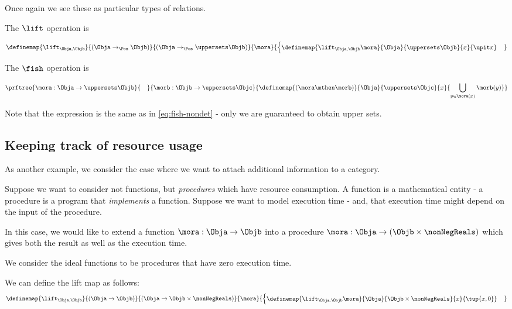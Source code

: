 Once again we see these as particular types of relations.

The $\lift$ operation is

\begin{equation}
    \definemap%
    {\lift_{\Obja, \Objb}}%
    {(\Obja \to_{\Pos} \Objb)}%
    {(\Obja \to_{\Pos} \uppersets\Objb)}%
    {\mora}{%
    \begin{cases}
    \definemap{\lift_{\Obja, \Objb}\mora}%
    {\Obja}{\uppersets\Objb}
    {x}{\upit x}
    \end{cases}
    }
\end{equation}

The $\fish$ operation is 

\begin{equation}
    \prftree%
    {\mora: \Obja \to \uppersets\Objb}%
    {\quad}{\morb: \Objb \to \uppersets\Objc}%
    {\definemap{(\mora\mthen\morb)}{\Obja}{\uppersets\Objc}%
    {x}{    \bigcup_{y\in\mora(x)}\morb(y) }}
  \end{equation}

  Note that the expression is the same as in \cref{eq:fish-nondet} - only we are guaranteed to obtain upper sets.

\subsection{Keeping track of resource usage}

As another example, we consider the case where we want to attach additional information to a category.

Suppose we want to consider not functions, but \emph{procedures} which have resource consumption.
A function is a mathematical entity - a procedure is a program that \emph{implements} a function.
Suppose we want to model execution time - and, that execution time might depend on the input of the procedure.

In this case, we would like to extend a function $\mora: \Obja \to \Objb$  
into a procedure $\mora: \Obja \to (\Objb\times \nonNegReals)$ which gives both the result as well as the execution time. 

We consider the ideal functions to be procedures that have zero execution time.

We can define the lift map as follows:
\begin{equation}
    \definemap%
    {\lift_{\Obja, \Objb}}%
    {(\Obja \to \Objb)}%
    {(\Obja \to \Objb \times \nonNegReals)}%
    {\mora}{%
    \begin{cases}
    \definemap{\lift_{\Obja, \Objb}\mora}%
    {\Obja}{\Objb\times\nonNegReals}
    {x}{\tup{x, 0}}
    \end{cases}
    }
\end{equation}


